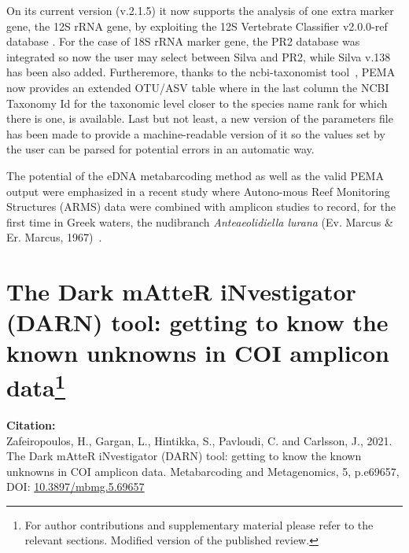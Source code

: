       On its current version (v.2.1.5) it now supports the analysis of one extra
      marker gene, the 12S rRNA gene, by exploiting the 12S Vertebrate Classifier v2.0.0-ref database \citep{teresita_m_porter_2021_5157047}.
      For the case of 18S rRNA marker gene, the PR2 database \citep{guillou2012protist} was integrated 
      so now the user may select between Silva and PR2,
      while Silva v.138 has been also added. 
      Furtheremore, thanks to the ncbi-taxonomist tool~\citep{buchmann2020collecting}, 
      PEMA now provides an extended OTU/ASV table where in the last column the NCBI Taxonomy Id 
      for the taxonomic level closer to the species name rank for which there is one, is available.
      Last but not least, a new version of the parameters file has been made to provide a machine-readable version 
      of it so the values set by the user can be parsed for potential errors in an automatic way. 

      The potential of the eDNA metabarcoding method as well as the 
      valid PEMA output
      were emphasized in a recent study where
      Autono-mous  Reef  Monitoring  Structures (ARMS) data 
      were combined with amplicon studies to 
      record, for the first time in Greek waters, the nudibranch 
      \textit{Anteaeolidiella lurana} (Ev. Marcus \& Er. Marcus, 1967)~\citep{bariche2020new}. 
   

   \newpage


% 
% 

\newpage

\section[The Dark mAtteR iNvestigator (DARN) tool: getting to know the known unknowns in COI amplicon data]{
      The Dark mAtteR iNvestigator (DARN) tool: getting to know the known unknowns in COI amplicon data\footnote{
      For author contributions and supplementary material please refer to the relevant sections. 
      Modified version of the published review.
   }
}
\label{publ:darn}

\textbf{Citation:} \\
Zafeiropoulos, H., Gargan, L., Hintikka, S., Pavloudi, C. and Carlsson, J., 2021. The Dark mAtteR iNvestigator (DARN) tool: getting to know the known unknowns in COI amplicon data. Metabarcoding and Metagenomics, 5, p.e69657, \\
DOI: \href{https://doi.org/10.3897/mbmg.5.69657}{10.3897/mbmg.5.69657}

